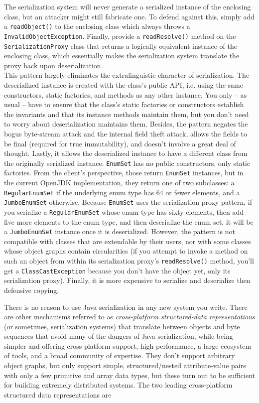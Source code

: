 \documentclass[8pt, table, xcdraw]{article}%
\begin{document}
The serialization system will never generate a serialized instance of the enclosing class, but an attacker might still fabricate one. To defend against this, simply add a \lstinline{readObject()} to the enclosing class which always throws a \lstinline{InvalidObjectException}. Finally, provide a \lstinline{readResolve()} method on the \lstinline{SerializationProxy} class that returns a logically equivalent instance of the enclosing class, which essentially makes the serialization system translate the proxy back upon deserialization.\\
This pattern largely eliminates the extralinguistic character of serialization. The deserialized instance is created with the class's public API, i.e. using the same constructors, static factories, and methods as any other instance. You only -- as usual -- have to ensure that the class’s static factories or constructors establish the invariants and that its instance methods maintain them, but you don't need to worry about deserialization maintains them. Besides, the pattern negates the bogus byte-stream attack and the internal field theft attack, allows the fields to be final (required for true immutability), and doesn’t involve a great deal of thought. Lastly, it allows the deserialized instance to have a different class from the originally serialized instance. \lstinline{EnumSet} has no public constructors, only static factories. From the client’s perspective, those return \lstinline{EnumSet} instances, but in the current OpenJDK implementation, they return one of two subclasses: a \lstinline{RegularEnumSet} if the underlying enum type has 64 or fewer elements, and a \lstinline{JumboEnumSet} otherwise. Because \lstinline{EnumSet} uses the serialization proxy pattern, if you serialize a \lstinline{RegularEnumSet} whose enum type has sixty elements, then add five more elements to the enum type, and then deserialize the enum set, it will be a \lstinline{JumboEnumSet} instance once it is deserialized. However, the pattern is not compatible with classes that are extendable by their users, nor with some classes whose object graphs contain circularities (if you attempt to invoke a method on such an object from within its serialization proxy’s \lstinline{readResolve()} method, you’ll get a \lstinline{ClassCastException} because you don’t have the object yet, only its serialization proxy). Finally, it is more expensive to serialize and deserialize then defensive copying.

There is no reason to use Java serialization in any new system you write. There are other mechanisms referred to as \emph{cross-platform structured-data representations} (or sometimes, serialization systems) that translate between objects and byte sequences that avoid many of the dangers of Java serialization, while being simpler and offering cross-platform support, high performance, a large ecosystem of tools, and a broad community of expertise. They don’t support arbitrary object graphs, but only support simple, structured/nested attribute-value pairs with only a few primitive and array data types, but these turn out to be sufficient for building extremely distributed systems. The two leading cross-platform structured data representations are
\end{document}
